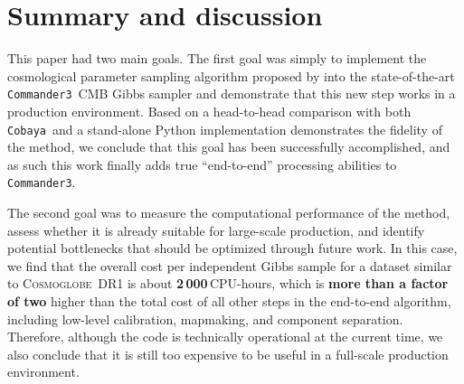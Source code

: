 \documentclass[twocolumn]{aa}
\def\commanderthree{\texttt{Commander3}}
\def\cobaya{\texttt{Cobaya}}
\newcommand{\cosmoglobe}{\textsc{Cosmoglobe}}
\begin{document}
\section{Summary and discussion}
\label{sec:conclusions}

This paper had two main goals. The first goal was simply to implement the cosmological parameter sampling algorithm proposed by \citet{racine:2016} into the state-of-the-art \commanderthree\ CMB Gibbs sampler and demonstrate that this new step works in a production environment. Based on a head-to-head comparison with both \cobaya\ and a stand-alone Python implementation demonstrates the fidelity of the method, we conclude that this goal has been successfully accomplished, and as such this work finally adds true ``end-to-end'' processing abilities to \commanderthree. 

The second goal was to measure the computational performance of the method, assess whether it is already suitable for large-scale production, and identify potential bottlenecks that should be optimized through future work. In this case, we find that the overall cost per independent Gibbs sample for a dataset similar to \cosmoglobe\ DR1 is about \textbf{2\,000}\,CPU-hours, which is \textbf{more than a factor of two} higher than the total cost of all other steps in the end-to-end algorithm, including low-level calibration, mapmaking, and component separation. Therefore, although the code is technically operational at the current time, we also conclude that it is still too expensive to be useful in a full-scale production environment.
\end{document}
